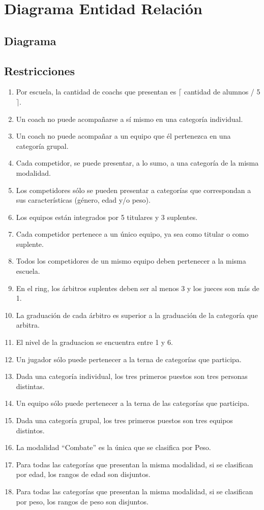 \section{Diagrama Entidad Relación}
\subsection{Diagrama}
\subsection{Restricciones}

\begin{enumerate}
\item Por escuela, la cantidad de coachs que presentan es $\lceil$ cantidad de alumnos / 5 $\rceil$.
\item Un coach no puede acompañarse a sí mismo en una categor\'ia individual.
\item Un coach no puede acompañar a un equipo que él pertenezca en una categor\'ia grupal.
\item Cada competidor, se puede presentar, a lo sumo, a una categoría de la misma modalidad.
\item Los competidores s\'olo se pueden presentar a categor\'ias que correspondan a sus caracter\'isticas (g\'enero, edad y/o peso).
\item Los equipos están integrados por 5 titulares y 3 suplentes.
\item Cada competidor pertenece a un único equipo, ya sea como titular o como suplente.
\item Todos los competidores de un mismo equipo deben pertenecer a la misma escuela.
\item En el ring, los \'arbitros suplentes deben ser al menos 3 y los jueces son m\'as de 1.
\item La graduaci\'on de cada \'arbitro es superior a la graduaci\'on de la categor\'ia que arbitra.
\item El nivel de la graduacion se encuentra entre 1 y 6.
\item Un jugador s\'olo puede pertenecer a la terna de categor\'ias que participa.
\item Dada una categor\'ia individual, los tres primeros puestos son tres personas distintas.
\item Un equipo s\'olo puede pertenecer a la terna de las categor\'ias que participa.
\item Dada una categor\'ia grupal, los tres primeros puestos son tres equipos distintos.
\item La modalidad ``Combate'' es la \'unica que se clasifica por Peso.
\item Para todas las categor\'ias que presentan la misma modalidad, si se clasifican por edad, los rangos de edad son disjuntos.
\item Para todas las categor\'ias que presentan la misma modalidad, si se clasifican por peso, los rangos de peso son disjuntos.
\end{enumerate}
